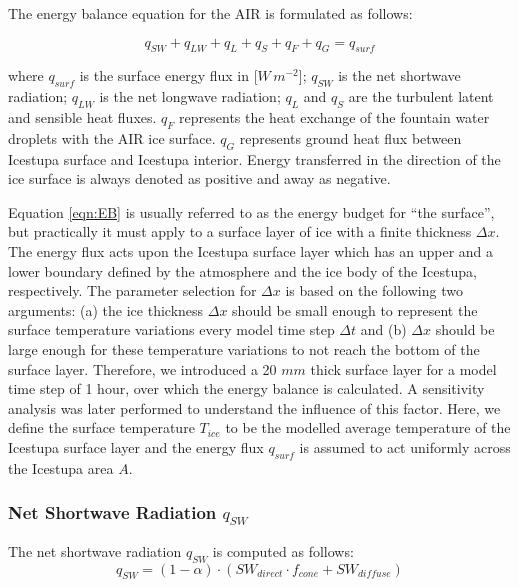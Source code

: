 \documentclass[utf8]{frontiersSCNS} %
\begin{document}
The energy balance equation \citep{Hock_2005} for the AIR is formulated as follows:

\begin{equation} q_{SW} + q_{LW} + q_{L} + q_{S} + q_{F} + q_{G} = q_{surf} \label{eqn:EB} \end{equation}

where $q_{surf}$ is the surface energy flux in [$W\,m^{-2}$]; $q_{SW}$ is the net shortwave radiation; $q_{LW}$ is the
net longwave radiation; $q_{L}$ and $q_{S}$ are the turbulent latent and sensible heat fluxes. $q_{F}$ represents the heat
exchange of the fountain water droplets with the AIR ice surface. $q_{G}$ represents ground heat flux between Icestupa
surface and Icestupa interior. Energy transferred in the direction of the ice surface is always denoted as positive and
away as negative.  

Equation \ref{eqn:EB} is usually referred to as the energy budget for “the surface”, but practically it must apply to
a surface layer of ice with a finite thickness $\Delta x$. The energy flux acts upon the Icestupa surface layer which
has an upper and a lower boundary defined by the atmosphere and the ice body of the Icestupa, respectively. The
parameter selection for $\Delta x$ is based on the following two arguments: (a) the ice thickness $\Delta x$ should be
small enough to represent the surface temperature variations every model time step $\Delta t$ and (b) $\Delta x$ should
be large enough for these temperature variations to not reach the bottom of the surface layer.  Therefore, we introduced
a 20 $mm$ thick surface layer for a model time step of 1 hour, over which the energy balance is calculated. A
sensitivity analysis was later performed to understand the influence of this factor. Here, we define the surface
temperature $T_{ice}$ to be the modelled average temperature of the Icestupa surface layer and the energy flux $q_{surf}$
is assumed to act uniformly across the Icestupa area $A$.

\subsubsection{Net Shortwave Radiation \texorpdfstring{$q_{SW}$}{Lg}} 
The net shortwave radiation $q_{SW}$ is computed as follows:
\begin{equation} q_{SW} = (1- \alpha)\cdot (SW_{direct} \cdot f_{cone} + SW_{diffuse}) \label{eqn:SW} \end{equation}
\end{document}
